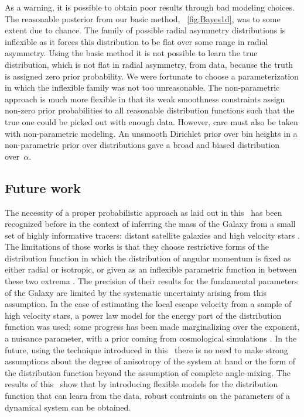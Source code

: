 As a warning, it is possible to obtain poor results through bad
modeling choices. The reasonable posterior from our basic method,
\figurename~\ref{fig:Bayes1d}, was to some extent due to chance. The
family of possible radial asymmetry distributions is inflexible as it
forces this distribution to be flat over some range in radial
asymmetry. Using the basic method it is not possible to learn the true
distribution, which is not flat in radial asymmetry, from data,
because the truth is assigned zero prior probability. We were
fortunate to choose a parameterization in which the inflexible family
was not too unreasonable. The non-parametric approach is much more
flexible in that its weak smoothness constraints assign non-zero prior
probabilities to all reasonable distribution functions such that the
true one could be picked out with enough data. However, care must also be
taken with non-parametric modeling. An unsmooth Dirichlet prior over
bin heights in a non-parametric prior over distributions gave a broad
and biased distribution over~$\alpha$.

\subsection{Future work}

The necessity of a proper probabilistic approach as laid out in this
\chaptername\ has been recognized before in the context of inferring the mass
of the Galaxy from a small set of highly informative tracers: distant
satellite galaxies \citep{Little87a} and high velocity stars
\citep{Leonard90a}. The limitations of those works is that they choose
restrictive forms of the distribution function in which the
distribution of angular momentum is fixed as either radial or
isotropic, or given as an inflexible parametric function in between
these two extrema \citep{Kochanek96a}. The precision of their results
for the fundamental parameters of the Galaxy are limited by the
systematic uncertainty arising from this assumption. In the case of
estimating the local escape velocity from a sample of high velocity
stars, a power law model for the energy part of the distribution
function was used; some progress has been made marginalizing over the
exponent, a nuisance parameter, with a prior coming from cosmological
simulations \citep{Smith07a}. In the future, using the technique
introduced in this \chaptername\ there is no need to make strong
assumptions about the degree of anisotropy of the system at hand or
the form of the distribution function beyond the assumption of
complete angle-mixing. The results of this \chaptername\ show that by
introducing flexible models for the distribution function that can
learn from the data, robust contraints on the parameters of a
dynamical system can be obtained.

